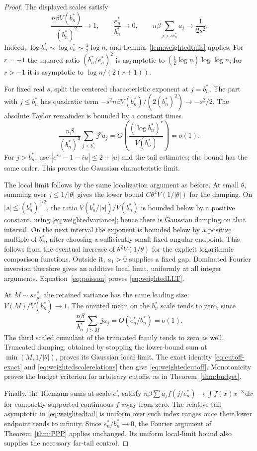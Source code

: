 \documentclass[11pt,a4paper]{article}
\numberwithin{equation}{section}
\theoremstyle{definition}
\theoremstyle{remark}
\newcommand{\dd}{\,\mathrm d}
\begin{document}
\begin{proof}
The displayed scales satisfy
\begin{equation}\label{eq:weightedscalerelations}
 \frac{n\beta V(b_n^*)}{(b_n^*)^2}\longrightarrow1,
 \qquad \frac{e_n^*}{b_n^*}\longrightarrow0,
 \qquad n\beta\sum_{j>se_n^*}a_j\longrightarrow\frac1{2s^2}.
\end{equation}
Indeed, $\log b_n^*\sim\log e_n^*\sim\tfrac12\log n$, and
Lemma~\ref{lem:weightedtails} applies. For $r=-1$ the squared ratio
$(b_n^*/e_n^*)^2$ is asymptotic to
$(\tfrac12\log n)\log\log n$; for $r>-1$ it is asymptotic to
$\log n/(2(r+1))$.

For fixed real $s$, split the centered characteristic exponent at
$j=b_n^*$. The part with $j\le b_n^*$ has quadratic term
$-s^2 n\beta V(b_n^*)/(2(b_n^*)^2)\to-s^2/2$. The absolute
Taylor remainder is bounded by a constant times
\[
 \frac{n\beta}{(b_n^*)^3}\sum_{j\le b_n^*}j^3a_j
 =O\left(\frac{(\log b_n^*)^r}{V(b_n^*)}\right)=o(1).
\]
For $j>b_n^*$, use $|e^{iu}-1-iu|\le2+|u|$ and the tail
estimates; the bound has the same order. This proves the Gaussian
characteristic limit.

The local limit follows by the same localization argument as before.
At small $\theta$, summing over $j\le1/|\theta|$ gives the lower
bound
$C\theta^2V(1/|\theta|)$ for the damping. On
$|s|\le(b_n^*)^{1/2}$, the ratio
$V(b_n^*/|s|)/V(b_n^*)$ is bounded below by a positive constant,
using \eqref{eq:weightedvariance}; hence there is Gaussian damping
on that interval. On the next interval the exponent is bounded below
by a positive multiple of $b_n^*$, after choosing a sufficiently small
fixed angular endpoint. This follows from the eventual increase of
$\theta^2V(1/\theta)$ for the explicit logarithmic comparison functions.
Outside it, $a_1>0$ supplies a fixed gap. Dominated Fourier inversion
therefore gives an additive local limit, uniformly at all integer
arguments. Equation~\eqref{eq:poisson} proves \eqref{eq:weightedLLT}.

At $M\sim se_n^*$, the retained variance has the same leading size:
$V(M)/V(b_n^*)\to1$. The omitted mean on the $b_n^*$ scale tends
to zero, since
\[
 \frac{n\beta}{b_n^*}\sum_{j>M}j a_j
       =O(e_n^*/b_n^*)=o(1).
\]
The third scaled cumulant of the truncated family tends to zero as
well. Truncated damping, obtained by stopping the lower-bound sum at
$\min(M,1/|\theta|)$, proves its Gaussian local limit. The exact
identity \eqref{eq:cutoff-exact} and \eqref{eq:weightedscalerelations}
then give \eqref{eq:weightedcutoff}. Monotonicity proves the budget
criterion for arbitrary cutoffs, as in Theorem~\ref{thm:budget}.

Finally, the Riemann sums at scale $e_n^*$ satisfy
$n\beta\sum a_j f(j/e_n^*)\to\int f(x)x^{-3}\dd x$ for compactly
supported continuous $f$ away from zero. The relative tail asymptotic
in \eqref{eq:weightedtail} is uniform over such index ranges once their
lower endpoint tends to infinity. Since $e_n^*/b_n^*\to0$, the
Fourier argument of Theorem~\ref{thm:PPP} applies unchanged. Its
uniform local-limit bound also supplies the necessary far-tail control.
\end{proof}
\end{document}
